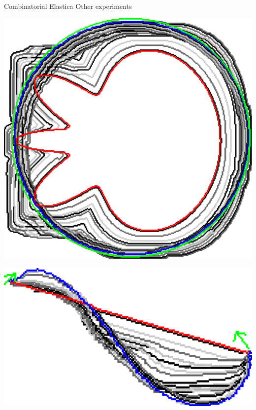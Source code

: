 \begin{frame}
	{Combinatorial Elastica}
	{Other experiments}
	
\begin{minipage}{0.49\textwidth}
\center
\includegraphics[scale=0.25]{figures/combinatorial-elastica/other-experiments/ii/elastica/len_pen_0.001000/jonctions_1/curve_segs_4/best/gs_0.25000/flower.png}
\end{minipage}
\begin{minipage}{0.49\textwidth}
\center
\includegraphics[scale=0.25]{figures/combinatorial-elastica/other-experiments/ii/elastica/len_pen_0.001000/jonctions_1/curve_segs_4/best/gs_0.25000/curve.png}
\end{minipage}
\end{frame}

